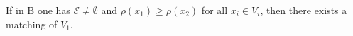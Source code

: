 If in B one has $\mathcal{E} \neq \emptyset$ and $\rho(x_1) \geq \rho(x_2)$ for all $x_i \in V_i$, then there exists a matching of $V_1$.
